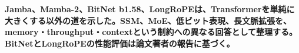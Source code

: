 \noindent\textbf{Jamba、Mamba-2、BitNet b1.58、LongRoPEは、Transformerを単純に大きくする以外の道を示した。SSM、MoE、低ビット表現、長文脈拡張を、memory・throughput・contextという制約への異なる回答として整理する。BitNetとLongRoPEの性能評価は論文著者の報告に基づく。}\autocite{src-0cba3ed32188,src-b5fbfc0d43e4,src-e0e69bb00ff7,src-fb3cf48135e8}
